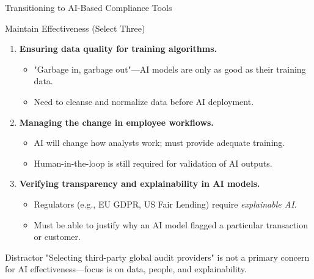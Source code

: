 \documentclass{beamer}
\begin{document}
	\begin{frame}{Transitioning to AI-Based Compliance Tools}
		\begin{block}{Maintain Effectiveness (Select Three)}
			\begin{enumerate}
				\item \textbf{Ensuring data quality for training algorithms.}
				\begin{itemize}
					\item "Garbage in, garbage out"—AI models are only as good as their training data.
					\item Need to cleanse and normalize data before AI deployment.
				\end{itemize}
				\item \textbf{Managing the change in employee workflows.}
				\begin{itemize}
					\item AI will change how analysts work; must provide adequate training.
					\item Human-in-the-loop is still required for validation of AI outputs.
				\end{itemize}
				\item \textbf{Verifying transparency and explainability in AI models.}
				\begin{itemize}
					\item Regulators (e.g., EU GDPR, US Fair Lending) require \textit{explainable AI}.
					\item Must be able to justify why an AI model flagged a particular transaction or customer.
				\end{itemize}
			\end{enumerate}
		\end{block}
		\begin{alertblock}{Distractor}
			"Selecting third-party global audit providers" is not a primary concern for AI effectiveness—focus is on data, people, and explainability.
		\end{alertblock}
	\end{frame}
	
\end{document}
